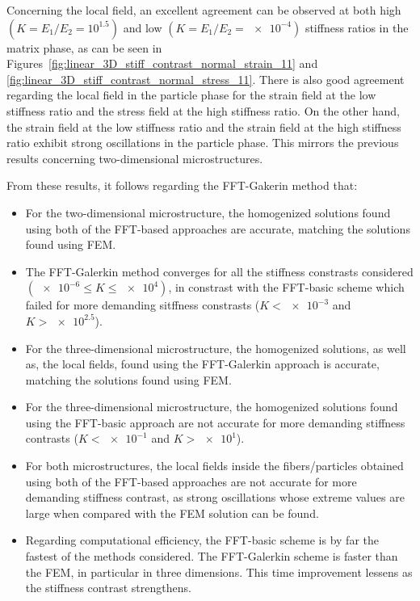 Concerning the local field, an excellent agreement can be observed at both high \((K=E_1/E_2=10^{1.5})\) and low \((K=E_1/E_2=\num{e-4})\) stiffness ratios in the matrix phase, as can be seen in Figures~\ref{fig:linear_3D_stiff_contrast_normal_strain_11} and \ref{fig:linear_3D_stiff_contrast_normal_stress_11}.
There is also good agreement regarding the local field in the particle phase for the strain field at the low stiffness ratio and the stress field at the high stiffness ratio.
On the other hand, the strain field at the low stiffness ratio and the strain field at the high stiffness ratio exhibit strong oscillations in the particle phase.
This mirrors the previous results concerning two-dimensional microstructures.

From these results, it follows regarding the FFT-Gakerin method that:
\begin{itemize}
  \item For the two-dimensional microstructure, the homogenized solutions found using both of the FFT-based approaches are accurate, matching the solutions found using FEM.
  \item The FFT-Galerkin method converges for all the stiffness constrasts considered \((\num{e-6} \leq K \leq \num{e4})\), in constrast with the FFT-basic scheme which failed for more demanding sitffness constrasts (\(K<\num{e-3}\) and \(K>\num{e2.5}\)).
  \item For the three-dimensional microstructure, the homogenized solutions, as well as, the local fields, found using the FFT-Galerkin approach is accurate, matching the solutions found using FEM.
  \item For the three-dimensional microstructure, the homogenized solutions found using the FFT-basic approach are not accurate for more demanding stiffness contrasts (\(K<\num{e-1}\) and \(K>\num{e1}\)).
  \item For both microstructures, the local fields inside the fibers/particles obtained using both of the FFT-based approaches are not accurate for more demanding stiffness contrast, as strong oscillations whose extreme values are large when compared with the FEM solution can be found.
  \item Regarding computational efficiency, the FFT-basic scheme is by far the fastest of the methods considered.
  The FFT-Galerkin scheme is faster than the FEM, in particular in three dimensions.
  This time improvement lessens as the stiffness contrast strengthens.
\end{itemize}


